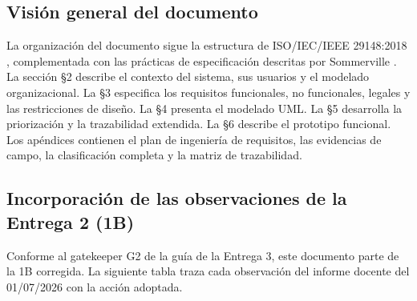 \documentclass[11pt,a4paper]{article}
\begin{document}
\subsection{Visión general del documento}

La organización del documento sigue la estructura de ISO/IEC/IEEE 29148:2018 \cite{iso29148},
complementada con las prácticas de especificación descritas por Sommerville \cite{sommerville2016}.
La sección §2 describe el contexto del sistema, sus usuarios y el modelado organizacional. La §3
especifica los requisitos funcionales, no funcionales, legales y las restricciones de diseño. La §4
presenta el modelado UML. La §5 desarrolla la priorización y la trazabilidad extendida. La §6
describe el prototipo funcional. Los apéndices contienen el plan de ingeniería de requisitos, las
evidencias de campo, la clasificación completa y la matriz de trazabilidad.

\subsection{Incorporación de las observaciones de la Entrega 2 (1B)}

Conforme al gatekeeper G2 de la guía de la Entrega 3, este documento parte de la 1B corregida. La
siguiente tabla traza cada observación del informe docente del 01/07/2026 con la acción adoptada.
\end{document}
